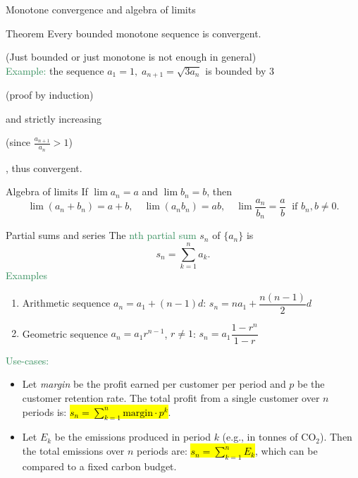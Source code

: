 \documentclass[11pt,aspectratio=169]{beamer}
\begin{document}
\begin{frame}{Monotone convergence and algebra of limits}
\begin{alertblock}{Theorem}
Every bounded monotone sequence is convergent.	
\end{alertblock}
{\small (Just bounded or just monotone is not enough in general) }\\[3mm]
\textcolor{SeaGreen}{Example:} the sequence $a_1=1, \; a_{n+1}=\sqrt{3a_n}$ is bounded by $3$ \begin{tiny} (proof by induction) \end{tiny} and strictly increasing \begin{tiny} (since $\frac{a_{n+1}}{a_n}>1$)\end{tiny}, thus convergent.\\[3mm]
\begin{block}{Algebra of limits}
If $\lim a_n=a$ and $\lim b_n=b$, then
\[
\lim (a_n+b_n)=a+b,\quad 
\lim (a_n b_n)=ab,\quad 
\lim \frac{a_n}{b_n}=\frac{a}{b} \;\text{ if }b_n,b\neq 0.
\]	
\end{block}
\end{frame}



\begin{frame}{Partial sums and series}
The \textcolor{SeaGreen}{nth partial sum} $s_n$ of $\{a_n\}$ is
\[
s_n=\sum_{k=1}^n a_k.
\]
\textcolor{SeaGreen}{Examples} 
\begin{enumerate}
\item Arithmetic sequence $a_n=a_1+(n-1)d$:\;\;\; $s_n=n a_1+\dfrac{n(n-1)}{2}d$
\item Geometric sequence $a_n=a_1 r^{n-1}$, $r\neq 1$:\;\;\; $s_n=a_1 \dfrac{1-r^n}{1-r}$
\end{enumerate}
\medskip
\textcolor{SeaGreen}{Use-cases:}
\begin{itemize}
\item Let \emph{margin} be the profit earned per customer per period and $p$ be the customer retention rate. The total profit from a single customer over \( n \) periods is: \hl{$s_n = \sum_{k=1}^n \text{margin} \cdot p^k$}.

\item  Let \( E_k \) be the emissions produced in period \( k \) (e.g., in tonnes of CO\(_2\)).  
Then the total emissions over \( n \) periods are: \hl{$s_n = \sum_{k=1}^n E_k$}, which can be compared to a fixed carbon budget.
\end{itemize}
\end{frame}
\end{document}

